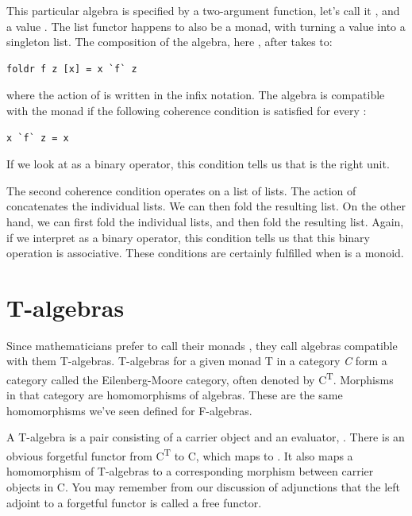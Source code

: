 This particular algebra is specified by a two-argument function, let's
call it , and a value . The list functor happens to
also be a monad, with  turning a value into a singleton
list. The composition of the algebra, here , after
 takes  to:

\begin{verbatim}
foldr f z [x] = x `f` z
\end{verbatim}

where the action of  is written in the infix notation. The
algebra is compatible with the monad if the following coherence
condition is satisfied for every :

\begin{verbatim}
x `f` z = x
\end{verbatim}

If we look at  as a binary operator, this condition tells us
that  is the right unit.

The second coherence condition operates on a list of lists. The action
of  concatenates the individual lists. We can then fold the
resulting list. On the other hand, we can first fold the individual
lists, and then fold the resulting list. Again, if we interpret
 as a binary operator, this condition tells us that this
binary operation is associative. These conditions are certainly
fulfilled when  is a monoid.

\section{T-algebras}\label{t-algebras}

Since mathematicians prefer to call their monads , they call
algebras compatible with them T-algebras. T-algebras for a given monad T
in a category \emph{C} form a category called the Eilenberg-Moore
category, often denoted by C\textsuperscript{T}. Morphisms in that
category are homomorphisms of algebras. These are the same homomorphisms
we've seen defined for F-algebras.

A T-algebra is a pair consisting of a carrier object and an evaluator,
. There is an obvious forgetful functor  from
C\textsuperscript{T} to C, which maps  to . It
also maps a homomorphism of T-algebras to a corresponding morphism
between carrier objects in C. You may remember from our discussion of
adjunctions that the left adjoint to a forgetful functor is called a
free functor.

